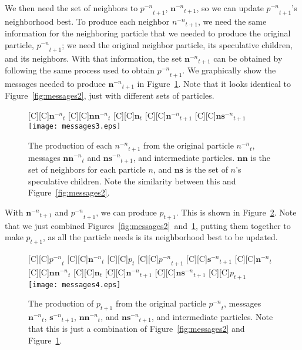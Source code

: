 \documentclass[journal,letterpaper]{IEEEtran}
\newcommand{\fig}[1]{Figure~\ref{fig:#1}}
\providecommand{\nonbest}[1]{\ensuremath{#1^{-n}}}
\providecommand{\p}{\ensuremath{p}}
\providecommand{\sset}{\ensuremath{\mathbf{s}}}
\providecommand{\nsset}{\ensuremath{\mathbf{ns}}}
\providecommand{\n}{\ensuremath{n}}
\providecommand{\nset}{\ensuremath{\mathbf{n}}}
\providecommand{\nnset}{\ensuremath{\mathbf{nn}}}
\begin{document}
We then need the set of neighbors to $\nonbest{\p}_{t+1}$,
$\nonbest{\nset}_{t+1}$, so we can update $\nonbest{\p}_{t+1}$'s neighborhood
best.  To produce each neighbor $\nonbest{\n}_{t+1}$, we need the same
information for the neighboring particle that we needed to produce the original
particle, $\nonbest{\p}_{t+1}$; we need the original neighbor particle, its
speculative children, and its neighbors.  With that information, the set
$\nonbest{\nset}_{t+1}$ can be obtained by following the same process used to
obtain $\nonbest{\p}_{t+1}$.  We graphically show the messages needed to
produce $\nonbest{\nset}_{t+1}$ in \fig{messages3}.  Note that it looks
identical to \fig{messages2}, just with different sets of particles.

\begin{figure}
  \centering
  [C][C]{$\nonbest{\nset}_{t}$}
  [C][C]{$\nonbest{\nnset}_{t}$}
  [C][C]{$\nset_{t}$}
  [C][C]{$\nonbest{\nset}_{t+1}$}
  [C][C]{$\nonbest{\nsset}_{t+1}$}
  \texttt{[image: messages3.eps]}
  \caption{The production of each $\nonbest{\n}_{t+1}$ from the original
  particle $\nonbest{\n}_{t}$, messages $\nonbest{\nnset}_{t}$ and
  $\nonbest{\nsset}_{t+1}$, and intermediate particles.  $\nnset$ is the set of
  neighbors for each particle $\n$, and $\nsset$ is the set of $\n$'s
  speculative children.  Note the similarity between this and \fig{messages2}.}
  \label{fig:messages3}
\end{figure}

With $\nonbest{\nset}_{t+1}$ and $\nonbest{\p}_{t+1}$, we can produce
$\p_{t+1}$.  This is shown in \fig{messages4}.  Note that we just combined
Figures~\ref{fig:messages2}~and~\ref{fig:messages3}, putting them together
to make $\p_{t+1}$, as all the particle needs is its neighborhood best to be
updated.

\begin{figure}
  \centering
  [C][C]{$\nonbest{\p}_{t}$}
  [C][C]{$\nonbest{\nset}_{t}$}
  [C][C]{$\p_{t}$}
  [C][C]{$\nonbest{\p}_{t+1}$}
  [C][C]{$\nonbest{\sset}_{t+1}$}
  [C][C]{$\nonbest{\nset}_{t}$}
  [C][C]{$\nonbest{\nnset}_{t}$}
  [C][C]{$\nset_{t}$}
  [C][C]{$\nonbest{\nset}_{t+1}$}
  [C][C]{$\nonbest{\nsset}_{t+1}$}
  [C][C]{$\p_{t+1}$}
  \texttt{[image: messages4.eps]}
  \caption{The production of $\p_{t+1}$ from the original particle 
  $\nonbest{\p}_{t}$, messages $\nonbest{\nset}_{t}$, $\nonbest{\sset}_{t+1}$,
  $\nonbest{\nnset}_{t}$, and $\nonbest{\nsset}_{t+1}$, and intermediate
  particles.  Note that this is just a combination of \fig{messages2} and
  \fig{messages3}.}
  \label{fig:messages4}
\end{figure}
\end{document}
